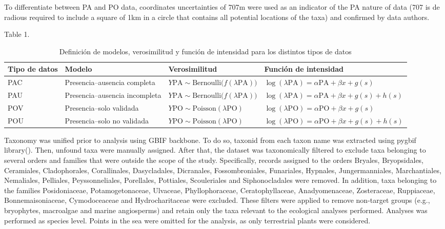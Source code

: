 \documentclass{article}
\begin{document}
To differentiate between PA and PO data, coordinates uncertainties of 707m were used as an indicator of the PA nature of data (707 is de radious required to include a square of 1km in a circle that contains all potential locations of the taxa) and confirmed by data authors. 

Table 1. 

\begin{table}[ht]
\centering
\caption{Definición de modelos, verosimilitud y función de intensidad para los distintos tipos de datos}
\begin{tabular}{llll}
\hline
\textbf{Tipo de datos} & \textbf{Modelo} & \textbf{Verosimilitud} & \textbf{Función de intensidad} \\
\hline
PAC & Presencia--ausencia completa &
$Y{\text{PA}} \sim \text{Bernoulli}\big(f(\lambda{\text{PA}})\big)$ &
$\log(\lambda{\text{PA}})=\alpha{\text{PA}}+\beta x + g(s)$ \\

PAU & Presencia--ausencia incompleta &
$Y{\text{PA}} \sim \text{Bernoulli}\big(f(\lambda{\text{PA}})\big)$ &
$\log(\lambda{\text{PA}})=\alpha{\text{PA}}+\beta x + g(s) + h(s)$ \\

POV & Presencia--solo validada &
$Y{\text{PO}} \sim \text{Poisson}(\lambda{\text{PO}})$ &
$\log(\lambda{\text{PO}})=\alpha{\text{PO}}+\beta x + g(s)$ \\

POU & Presencia--solo no validada &
$Y{\text{PO}} \sim \text{Poisson}(\lambda{\text{PO}})$ &
$\log(\lambda{\text{PO}})=\alpha{\text{PO}}+\beta x + g(s) + h(s)$ \\

\hline
\end{tabular}
\end{table}

Taxonomy was unified prior to analysis using GBIF backbone. To do so, taxonid from each taxon name was extracted using pygbif library(). Then, unfound taxa were manually assigned. After that, the dataset was taxonomically filtered to exclude taxa belonging to several orders and families that were outside the scope of the study. Specifically, records assigned to the orders Bryales, Bryopsidales, Ceramiales, Cladophorales, Corallinales, Dasycladales, Dicranales, Fossombroniales, Funariales, Hypnales, Jungermanniales, Marchantiales, Nemaliales, Pelliales, Peyssonneliales, Porellales, Pottiales, Scouleriales and Siphonocladales were removed. In addition, taxa belonging to the families Posidoniaceae, Potamogetonaceae, Ulvaceae, Phyllophoraceae, Ceratophyllaceae, Anadyomenaceae, Zosteraceae, Ruppiaceae, Bonnemaisoniaceae, Cymodoceaceae and Hydrocharitaceae were excluded. These filters were applied to remove non-target groups (e.g., bryophytes, macroalgae and marine angiosperms) and retain only the taxa relevant to the ecological analyses performed. Analyses was performed as species level. Points in the sea were omitted for the analysis, as only terrestrial plants were considered.
\end{document}
